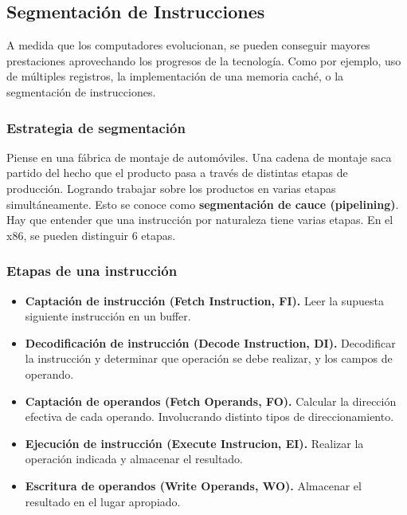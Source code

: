 \documentclass{article}
\begin{document}
\subsection*{Segmentaci\'{o}n de Instrucciones}
A medida que los computadores evolucionan, se pueden conseguir mayores prestaciones
aprovechando los progresos de la tecnolog\'{i}a. Como por ejemplo, uso de m\'{u}ltiples
registros, la implementaci\'{o}n de una memoria cach\'{e}, o la segmentaci\'{o}n de
instrucciones.

\subsubsection*{Estrategia de segmentaci\'{o}n}
Piense en una f\'{a}brica de montaje de autom\'{o}viles. Una cadena de montaje
saca partido del hecho que el producto pasa a trav\'{e}s de distintas etapas
de producci\'{o}n. Logrando trabajar sobre los productos en varias etapas
simult\'{a}neamente. Esto se conoce como \textbf{segmentaci\'{o}n de cauce (pipelining)}.
Hay que entender que una instrucci\'{o}n por naturaleza tiene varias etapas.
En el x86, se pueden distinguir 6 etapas.

\subsubsection*{Etapas de una instrucci\'{o}n}
\begin{itemize}
      \item \textbf{Captaci\'{o}n de instrucci\'{o}n (Fetch Instruction, FI).}
            Leer la supuesta siguiente instrucci\'{o}n en un buffer.

      \item \textbf{Decodificaci\'{o}n de instrucci\'{o}n (Decode Instruction, DI).}
            Decodificar la instrucci\'{o}n y determinar que operaci\'{o}n se debe
            realizar, y los campos de operando.

      \item \textbf{Captaci\'{o}n de operandos (Fetch Operands, FO).}
            Calcular la direcci\'{o}n efectiva de cada operando. Involucrando
            distinto tipos de direccionamiento.

      \item \textbf{Ejecuci\'{o}n de instrucci\'{o}n (Execute Instrucion, EI).}
            Realizar la operaci\'{o}n indicada y almacenar el resultado.

      \item \textbf{Escritura de operandos (Write Operands, WO).}
            Almacenar el resultado en el lugar apropiado.
\end{itemize}
\end{document}
